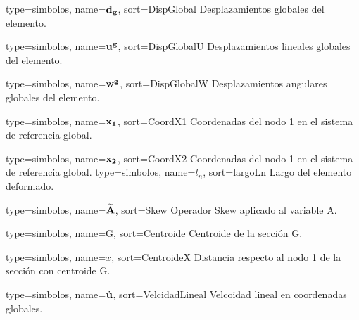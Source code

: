 {
	type={simbolos},
	name={$\bf{d}_g$}, %
	sort={DispGlobal} %
}
{Desplazamientos globales del elemento.}

{
	type={simbolos},
	name={$\bf{u}^g$}, %
	sort={DispGlobalU} %
}
{Desplazamientos lineales globales del elemento.}

{
	type={simbolos},
	name={$\bf{w}^g$}, %
	sort={DispGlobalW} %
}
{Desplazamientos angulares globales del elemento.}


{
	type={simbolos},
	name={$\bf{x}_1$}, %
	sort={CoordX1} %
}
{Coordenadas del nodo 1 en el sistema de referencia global.}

{
	type={simbolos},
	name={$\bf{x}_2$}, %
	sort={CoordX2} %
}
{Coordenadas del nodo 1 en el sistema de referencia global.}
{
	type={simbolos},
	name={$l_n$}, %
	sort={largoLn} %
}
{Largo del elemento deformado.}

{
	type={simbolos},
	name={$\widetilde{\bf{A}}$}, %
	sort={Skew} %
}
{Operador Skew aplicado al variable A.}

{
	type={simbolos},
	name={G}, %
	sort={Centroide} %
}
{Centroide de la sección G.}


{
	type={simbolos},
	name={$x$}, %
	sort={CentroideX} %
}
{Distancia respecto al nodo 1 de la sección con centroide G.}

{
	type={simbolos},
	name={$\dot{\bf{u}}$}, %
	sort={VelcidadLineal} %
}
{Velcoidad lineal en coordenadas globales.}

